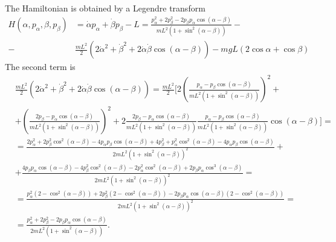 \begin{solution}[8.1]
The Hamiltonian is obtained by a Legendre transform
\begin{align}
    H(\alpha, p_\alpha, \beta, p_\beta) &= \dot{\alpha}p_\alpha + \dot{\beta}p_\beta - L = \frac{p^2_\alpha+ 2p^2_\beta - 2p_\beta p_\alpha \cos(\alpha-\beta)}{mL^2(1+\sin^2(\alpha - \beta))} - \\
    -&\frac{mL^2}{2}(2\dot{\alpha}^2 + \dot{\beta}^2 + 2\dot{\alpha}\dot{\beta}\cos(\alpha - \beta)) - mgL(2\cos \alpha + \cos \beta ) 
\end{align}
The second  term is
\begin{align}
    &\frac{mL^2}{2}(2\dot{\alpha}^2 + \dot{\beta}^2 + 2\dot{\alpha}\dot{\beta}\cos(\alpha - \beta)) = \frac{mL^2}{2}[2\left(\frac{p_\alpha- p_\beta \cos(\alpha-\beta)}{mL^2(1+\sin^2(\alpha - \beta))}\right)^2 + \\
    & +\left(\frac{2p_\beta - p_\alpha \cos(\alpha-\beta)}{mL^2(1+\sin^2(\alpha - \beta))}\right)^2 +  2 \frac{2p_\beta - p_\alpha \cos(\alpha-\beta)}{mL^2(1+\sin^2(\alpha - \beta))}\frac{p_\alpha- p_\beta \cos(\alpha-\beta)}{mL^2(1+\sin^2(\alpha - \beta))}\cos(\alpha-\beta)]= \\
    & = \frac{2p^2_\alpha + 2p^2_\beta\cos^2(\alpha-\beta) - 4p_\alpha p_\beta \cos(\alpha-\beta) + 4p^2_\beta + p^2_\alpha \cos^2(\alpha-\beta) - 4p_\alpha p_\beta \cos (\alpha-\beta)}{2mL^2(1+\sin^2(\alpha - \beta))^2} + \\
    & + \frac{4p_\beta p_\alpha \cos(\alpha-\beta) -4p^2_\beta\cos^2(\alpha - \beta) - 2 p^2_\alpha\cos^2(\alpha-\beta) + 2p_\beta p_\alpha \cos^3(\alpha-\beta)}{2mL^2(1+\sin^2(\alpha - \beta))^2} = \\
    &= \frac{p^2_\alpha(2-\cos^2(\alpha-\beta)) + 2p^2_\beta(2-\cos^2(\alpha-\beta)) - 2p_\beta p_\alpha\cos(\alpha-\beta)(2 -\cos^2(\alpha-\beta))}{2mL^2(1+\sin^2(\alpha - \beta))^2} = \\
    &= \frac{p^2_\alpha + 2p^2_\beta - 2p_\beta p_\alpha\cos(\alpha-\beta)}{2mL^2(1+\sin^2(\alpha - \beta))}.
\end{align}


\end{solution}
